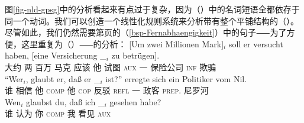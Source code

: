 图\ref{fig-nld-gpsg}中的分析看起来有点过于复杂，因为（）中的名词短语全都依存于同一个动词。我们可以创造一个线性化规则系统来分析带有整个平铺结构的（）。尽管如此，我们仍然需要第\pageref{bsp-Fernabhaengigkeit}页的（\ref{bsp-Fernabhaengigkeit}）中的句子⸺为了方便，这里重复为（）⸺的分析：
\eal
\ex\label{bsp-um-zwei-millionen-zwei}
\gll {}[Um zwei Millionen Mark]$_i$ soll er versucht haben, [eine Versicherung \_$_i$ zu betrügen].\footnotemark\\
       {}\spacebr{}大约 两 百万 马克 应该 他 试图 \textsc{aux} \spacebr{}一 保险公司 {} \textsc{inf} 欺骗\\
\ex
\gll "`Wer$_i$, glaubt er, daß er \_$_i$ ist?"' erregte sich ein Politiker vom Nil.\footnotemark\\
    \spacebr{}谁 相信 他 \textsc{comp} 他 {} \textsc{cop} 反驳 \textsc{refl} 一 政客 \textsc{prep}. 尼罗河\\
\ex\label{ex-wen-glaubst-du-dass-zwei}
\gll Wen$_i$ glaubst du, daß ich \_$_i$ gesehen habe?\footnotemark\\
     谁 认为 你 \textsc{comp} 我 {} 看见 \textsc{aux}\\
